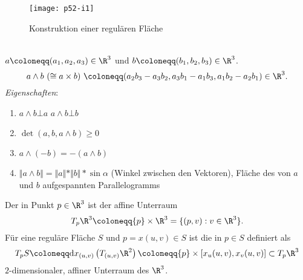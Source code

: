 \begin{figure}[H]
  \texttt{[image: p52-i1]}
  \caption{Konstruktion einer regulären Fläche}
\end{figure}

\begin{remark}
  \ \\
  $ a \coloneqq (a_1, a_2, a_3) \in \R^3 $ und $ b \coloneqq (b_1, b_2, b_3) \in \R^3 $.
  \begin{equation*}
    a \wedge b \ (\cong a \times b) \ \coloneqq (a_2b_3-a_3b_2, a_3b_1-a_1b_3, a_1b_2-a_2b_1) \in \R^3\text{.}
  \end{equation*}
  \emph{Eigenschaften}:
  \begin{enumerate}
    \item $ a \wedge b \bot a $ \quad $ a \wedge b \bot b $ 
    \item $ \det(a, b, a \wedge b) \geq 0 $
    \item $ a \wedge (-b) = - (a \wedge b) $
    \item $ \Vert a \wedge b \Vert = \Vert a \Vert * \Vert b \Vert * \sin \alpha $ (Winkel zwischen den Vektoren), Fläche des von $ a $ und $ b $ aufgespannten Parallelogramms
  \end{enumerate}
\end{remark}

\begin{definition}[Tangentialraum]
  Der \label{def:tangentialraum} in Punkt $ p \in \R^3 $ ist der affine Unterraum
  \begin{equation*}
    T_p\R^3 \coloneqq \{ p \} \times \R^3 = \{ (p,v) : v \in \R^3 \}\text{.}
  \end{equation*}
  Für eine reguläre Fläche $ S $ und $ p = x(u,v) \in S $ ist die \label{def:tangentialebene} in $ p \in S $ definiert als
  \begin{equation*}
    T_pS \coloneqq \text{d}x_{(u,v)}\left(T_{(u,v)}\R^2\right) \coloneqq \{ p \} \times [x_u(u,v), x_v(u,v)] \subset T_p\R^3
  \end{equation*}
  $ 2 $-dimensionaler, affiner Unterraum des $ \R^3 $.
\end{definition}


